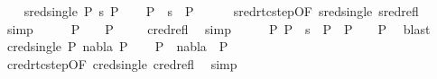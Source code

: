 \begin{isabellebody}
\ \ \isamarkupfalse%
\ {\isacharparenleft}{\kern0pt}sred{\isacharunderscore}{\kern0pt}single\ P{}\ s{}\ P{}{\isacharparenright}{\kern0pt}\isanewline
\ \ \isamarkupfalse%
\ {\isachardoublequoteopen}P{}\ {\isasymturnstile}\ s{}\ {\isasymleadsto}\isactrlsup {\isacharasterisk}{\kern0pt}\ P{}{\isachardoublequoteclose}\isanewline
\ \ \ \ \isamarkupfalse%
\ sred{\isacharunderscore}{\kern0pt}rtc{\isacharunderscore}{\kern0pt}step{\isacharbrackleft}{\kern0pt}OF\ sred{\isacharunderscore}{\kern0pt}single\ sred{\isacharunderscore}{\kern0pt}refl{\isacharbrackright}{\kern0pt}\ \isamarkupfalse%
\ simp\isanewline
\ \ \isamarkupfalse%
\ \isamarkupfalse%
\ {\isachardoublequoteopen}P{}\ {\isasymturnstile}\ {\isacharbraceleft}{\kern0pt}{\isacharbraceright}{\kern0pt}\ {\isasymrightarrow}\isactrlsup {\isacharasterisk}{\kern0pt}\ P{}{\isachardoublequoteclose}\isanewline
\ \ \ \isamarkupfalse%
\ cred{\isacharunderscore}{\kern0pt}refl\ \isamarkupfalse%
\ simp\isanewline
\ \ \isamarkupfalse%
\ \isamarkupfalse%
\ {\isachardoublequoteopen}{\isasymexists}P{}{\isachardot}{\kern0pt}\ P{}\ {\isasymturnstile}\ s{}\ {\isasymleadsto}\isactrlsup {\isacharasterisk}{\kern0pt}\ P{}\ {\isasymand}\ P{}\ {\isasymturnstile}\ {\isacharbraceleft}{\kern0pt}{\isacharbraceright}{\kern0pt}\ {\isasymrightarrow}\isactrlsup {\isacharasterisk}{\kern0pt}\ P{}{\isachardoublequoteclose}\ \isamarkupfalse%
\ blast\isanewline
{}\isamarkupfalse%
\isanewline
\ \ \isamarkupfalse%
\ {\isacharparenleft}{\kern0pt}cred{\isacharunderscore}{\kern0pt}single\ P{}\ nabla{}\ P{}{\isacharparenright}{\kern0pt}\isanewline
\ \ \isamarkupfalse%
\ {\isachardoublequoteopen}P{}\ {\isasymturnstile}\ nabla{}\ {\isasymrightarrow}\isactrlsup {\isacharasterisk}{\kern0pt}\ P{}{\isachardoublequoteclose}\isanewline
\ \ \ \ \isamarkupfalse%
\ cred{\isacharunderscore}{\kern0pt}rtc{\isacharunderscore}{\kern0pt}step{\isacharbrackleft}{\kern0pt}OF\ cred{\isacharunderscore}{\kern0pt}single\ cred{\isacharunderscore}{\kern0pt}refl{\isacharbrackright}{\kern0pt}\ \isamarkupfalse%
\ simp\isanewline

\end{isabellebody}
